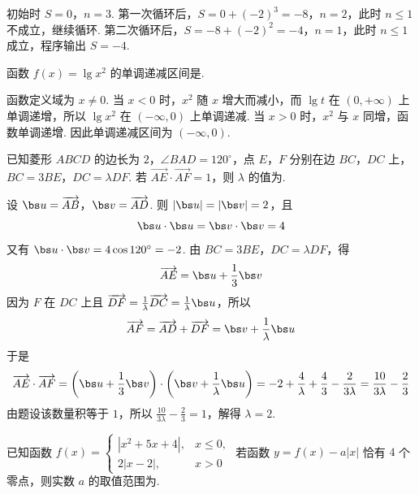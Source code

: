 
\begin{solution}
初始时 \(S=0\)，\(n=3\). 第一次循环后，\(S=0+(-2)^3=-8\)，\(n=2\)，此时 \(n\leqslant1\) 不成立，继续循环. 第二次循环后，\(S=-8+(-2)^2=-4\)，\(n=1\)，此时 \(n\leqslant1\) 成立，程序输出 \(S=-4\).
\end{solution}

\begin{problem}
函数 \( f(x) = \lg x^{2} \) 的单调递减区间是\fillinblank{}.
\end{problem}


\begin{solution}
函数定义域为 \(x\ne0\). 当 \(x<0\) 时，\(x^2\) 随 \(x\) 增大而减小，而 \(\lg t\) 在 \((0,+\infty)\) 上单调递增，所以 \(\lg x^2\) 在 \((-\infty,0)\) 上单调递减. 当 \(x>0\) 时，\(x^2\) 与 \(x\) 同增，函数单调递增. 因此单调递减区间为 \((-\infty,0)\).
\end{solution}

\begin{problem}
已知菱形 \(ABCD\) 的边长为 \(2\)，\(\angle BAD = 120^{\circ}\)，点 \(E\)，\(F\) 分别在边 \(BC\)，\(DC\) 上，\(BC = 3BE\)，\(DC = \lambda DF\). 若 \(\overrightarrow{AE} \cdot \overrightarrow{AF} = 1\)，则 \(\lambda\) 的值为\fillinblank{}.
\end{problem}


\begin{solution}
设 \(\bs u=\overrightarrow{AB}\)，\(\bs v=\overrightarrow{AD}\). 则 \(|\bs u|=|\bs v|=2\)，且
\[
\bs u\cdot\bs u=\bs v\cdot\bs v=4
\]
又有 \(\bs u\cdot\bs v=4\cos120^{\circ}=-2\).
由 \(BC=3BE\)，\(DC=\lambda DF\)，得
\[
\overrightarrow{AE}=\bs u+\frac13\bs v
\]
因为 \(F\) 在 \(DC\) 上且 \(\overrightarrow{DF}=\frac1\lambda\overrightarrow{DC}=\frac1\lambda\bs u\)，所以
\[
\overrightarrow{AF}=\overrightarrow{AD}+\overrightarrow{DF}=\bs v+\frac1\lambda\bs u
\]
于是
\[
\overrightarrow{AE}\cdot\overrightarrow{AF}
=\left(\bs u+\frac13\bs v\right)\cdot\left(\bs v+\frac1\lambda\bs u\right)
=-2+\frac4\lambda+\frac43-\frac{2}{3\lambda}
=\frac{10}{3\lambda}-\frac23
\]
由题设该数量积等于 \(1\)，所以 \(\frac{10}{3\lambda}-\frac23=1\)，解得 \(\lambda=2\).
\end{solution}

\begin{problem}
已知函数 \( f(x) = \begin{cases}
|x^2 + 5x + 4|, & x \leqslant 0,\\
2|x - 2|, & x > 0
\end{cases} \) 若函数 \( y = f(x) - a|x| \) 恰有 \(4\) 个零点，则实数 \(a\) 的取值范围为\fillinblank{}.
\end{problem}

